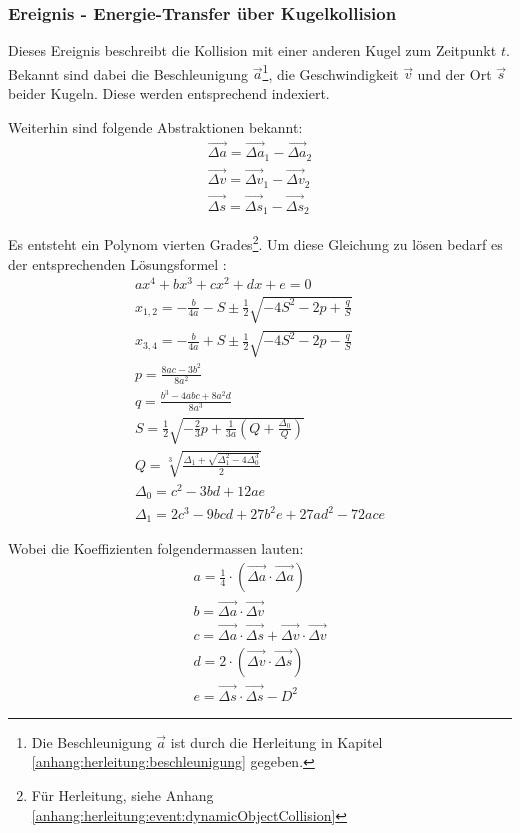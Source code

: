 \subsubsection{Ereignis - Energie-Transfer über Kugelkollision}
Dieses Ereignis beschreibt die Kollision mit einer anderen Kugel zum Zeitpunkt $t$.
Bekannt sind dabei die Beschleunigung $\vec{a}$\footnote{Die Beschleunigung $\vec{a}$ ist durch die Herleitung in Kapitel \ref{anhang:herleitung:beschleunigung}
gegeben.}, die Geschwindigkeit $\vec{v}$ und der Ort $\vec{s}$ beider Kugeln.
Diese werden entsprechend indexiert.

Weiterhin sind folgende Abstraktionen bekannt:
\begin{align}
    \vec{\Delta a} = \vec{\Delta a}_1 - \vec{\Delta a}_2\\
    \vec{\Delta v} = \vec{\Delta v}_1 - \vec{\Delta v}_2\\
    \vec{\Delta s} = \vec{\Delta s}_1 - \vec{\Delta s}_2
\end{align}

Es entsteht ein Polynom vierten Grades\footnote{Für Herleitung, siehe Anhang \ref{anhang:herleitung:event:dynamicObjectCollision}}.
Um diese Gleichung zu lösen bedarf es der entsprechenden Lösungsformel \cite{wiki.polynom:1}:
\begin{align}
    ax^4 + bx^3 + cx^2 + dx + e = 0\\
    x_{1,2} = -\frac{b}{4a} - S \pm \frac{1}{2}\sqrt{-4S^2 - 2p + \frac{q}{S}}\\
    x_{3,4} = -\frac{b}{4a} + S \pm \frac{1}{2}\sqrt{-4S^2 - 2p - \frac{q}{S}}\\
    p = \frac{8ac - 3b^2}{8a^2}\\
    q = \frac{b^3 - 4abc + 8a^{2}d}{8a^3}\\
    S = \frac{1}{2}\sqrt{-\frac{2}{3}p + \frac{1}{3a}(Q + \frac{\Delta_0}{Q})}\\
    Q = \sqrt[3]{\frac{\Delta_1 + \sqrt{\Delta_{1}^2 - 4\Delta_{0}^3}}{2}}\\
    \Delta_0 = c^2 - 3bd + 12ae\\
    \Delta_1 = 2c^3 - 9bcd + 27b^{2}e + 27ad^2 - 72ace
\end{align}

Wobei die Koeffizienten folgendermassen lauten:
\begin{align}
    a = \frac{1}{4} \cdot (\vec{\Delta a} \cdot \vec{\Delta a})\\
    b = \vec{\Delta a} \cdot \vec{\Delta v}\\
    c = \vec{\Delta a} \cdot \vec{\Delta s} + \vec{\Delta v} \cdot \vec{\Delta v}\\
    d = 2 \cdot (\vec{\Delta v} \cdot \vec{\Delta s})\\
    e = \vec{\Delta s} \cdot \vec{\Delta s} - D^2
\end{align}

